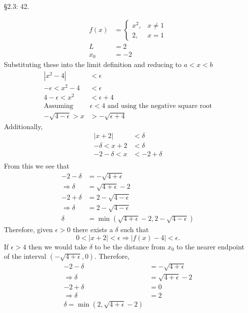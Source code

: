 \documentclass{hwset}
\begin{document}
\begin{problem}[2.]\S 2.3: 42.
\end{problem}

\begin{solution}
	\begin{align*}
		f(x) &= \begin{cases} x^2, & x\ne 1 \\ 2, & x=1 \end{cases} \\
		L &= 2 \\
		x_0 &= -2
	\end{align*}
	Substituting these into the limit definition and reducing to $a < x <b$
	\begin{align*}
		\left|x^2 - 4\right| &< \epsilon \\
		-\epsilon < x^2 - 4 &< \epsilon \\
		4 - \epsilon < x^2 &< \epsilon + 4 \\
		\text{Assuming }& \epsilon < 4 \text{ and using the negative square root}\\
		-\sqrt{4 - \epsilon} > x &> -\sqrt{\epsilon + 4}
	\end{align*}
	Additionally,
	\begin{align*}
		|x+2| &< \delta \\
		-\delta < x + 2 &< \delta \\
		-2 - \delta < x &< -2 + \delta \\
	\end{align*}
	From this we see that 
	\begin{align*}
		-2 - \delta &= -\sqrt{4 + \epsilon} \\
		\Rightarrow \delta &= \sqrt{4 + \epsilon} - 2 \\
		-2 + \delta &= 2 - \sqrt{4 - \epsilon} \\
		\Rightarrow \delta &= 2 - \sqrt{4 - \epsilon} \\
		\delta &= \min(\sqrt{4 + \epsilon} - 2, 2 - \sqrt{4 - \epsilon}) 
	\end{align*}
	Therefore, given $\epsilon > 0$ there exists a $\delta$ such that 
	\begin{equation*}
		0<|x + 2|<\epsilon \Rightarrow |f(x) - 4| < \epsilon.
	\end{equation*}
	 If $\epsilon > 4$ then we would take $\delta$ to be the distance
	from $x_0$ to the nearer endpoint of the interval $(-\sqrt{4 + \epsilon},0)$.
	Therefore,
	\begin{align*}
		-2 - \delta &= -\sqrt{4 + \epsilon} \\
		\Rightarrow \delta &= \sqrt{4 + \epsilon} - 2 \\
		-2 + \delta &= 0 \\
		\Rightarrow \delta &= 2 \\
		\delta = \min(2, \sqrt{4 + \epsilon} - 2)
	\end{align*}
\end{solution}
\end{document}
